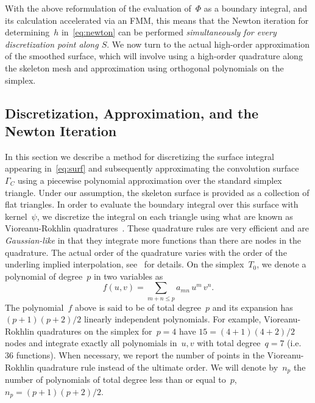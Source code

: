 \documentclass[11pt]{article}
\numberwithin{equation}{section}
\newcommand{\vct}{\vectorsym}
\DeclareMathOperator\erf{Erf}
\newcommand\bx{\vct{x}}
\newcommand\by{\vct{y}}
\newcommand\bn{\boldsymbol n}
\begin{document}


With the above reformulation of the evaluation of~$\Phi$ as a boundary
integral, and its calculation accelerated via an FMM, this means that
the Newton iteration for determining~$h$ in~\eqref{eq:newton} can be
performed \emph{simultaneously for every discretization point along
  $S$}. We now turn to the actual high-order approximation of the
smoothed surface, which will involve using a high-order quadrature
along the skeleton mesh and approximation using orthogonal polynomials
on the simplex.




\subsection{Discretization, Approximation, and the Newton
  Iteration}
\label{sec:disc}

In this section we describe a method for discretizing the surface
integral appearing in~\eqref{eq:surf} and subsequently approximating
the convolution surface~$\Gamma_C$ using a piecewise polynomial
approximation over the standard simplex triangle. Under our
assumption, the skeleton surface is provided as a collection of flat
triangles. In order to evaluate the boundary integral over this
surface with kernel~$\psi$, we discretize the integral on each
triangle using what are known as Vioreanu-Rokhlin
quadratures~\cite{vioreanu_2014}. These quadrature rules are very
efficient and are \emph{Gaussian-like} in that they integrate more
functions than there are nodes in the quadrature. The actual order of
the quadrature varies with the order of the underling implied
interpolation, see~\cite{vioreanu_2014} for details.
On the simplex~$T_0$, we
denote a polynomial of degree~$p$ in two variables as
\begin{equation}
  f(u,v) = \sum_{m+n \leq p} a_{mn} \, u^m \, v^n.
\end{equation}
The polynomial~$f$ above is said to be of total degree~$p$ and its
expansion has~$(p+1)(p+2)/2$ linearly independent polynomials.  For
example, Vioreanu-Rokhlin quadratures on the simplex for~$p=4$ have
$15=(4+1)(4+2)/2$ nodes and integrate exactly all polynomials in~$u,v$
with total degree~$q=7$ (i.e. 36 functions). When necessary, we report the
number of points in the Vioreanu-Rokhlin quadrature rule instead of
the ultimate order.
We will denote by~$n_p$ the number of polynomials of total degree less
than or equal to~$p$,~$n_p = (p+1)(p+2)/2$.
\end{document}
